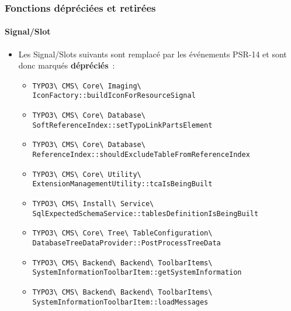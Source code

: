 \begin{frame}[fragile]
	\frametitle{Fonctions dépréciées et retirées}
	\framesubtitle{Signal/Slot}

	\lstset{basicstyle=\tiny\ttfamily}

	\begin{itemize}
		\item Les Signal/Slots suivants sont remplacé par les événements PSR-14 et
			sont donc marqués \textbf{dépréciés}~:
			\newline

			\begin{itemize}\tiny
				\item \texttt{TYPO3\textbackslash
					CMS\textbackslash
					Core\textbackslash
					Imaging\textbackslash
					IconFactory::buildIconForResourceSignal}
					\newline
				\item \texttt{TYPO3\textbackslash
					CMS\textbackslash
					Core\textbackslash
					Database\textbackslash
					SoftReferenceIndex::setTypoLinkPartsElement}
					\newline
				\item \texttt{TYPO3\textbackslash
					CMS\textbackslash
					Core\textbackslash
					Database\textbackslash
					ReferenceIndex::shouldExcludeTableFromReferenceIndex}
					\newline
				\item \texttt{TYPO3\textbackslash
					CMS\textbackslash
					Core\textbackslash
					Utility\textbackslash
					ExtensionManagementUtility::tcaIsBeingBuilt}
					\newline
				\item \texttt{TYPO3\textbackslash
					CMS\textbackslash
					Install\textbackslash
					Service\textbackslash
					SqlExpectedSchemaService::tablesDefinitionIsBeingBuilt}
					\newline
				\item \texttt{TYPO3\textbackslash
					CMS\textbackslash
					Core\textbackslash
					Tree\textbackslash
					TableConfiguration\textbackslash
					DatabaseTreeDataProvider::PostProcessTreeData}
					\newline
				\item \texttt{TYPO3\textbackslash
					CMS\textbackslash
					Backend\textbackslash
					Backend\textbackslash
					ToolbarItems\textbackslash
					SystemInformationToolbarItem::getSystemInformation}
					\newline
				\item \texttt{TYPO3\textbackslash
					CMS\textbackslash
					Backend\textbackslash
					Backend\textbackslash
					ToolbarItems\textbackslash
					SystemInformationToolbarItem::loadMessages}

			\end{itemize}

	\end{itemize}

\end{frame}

